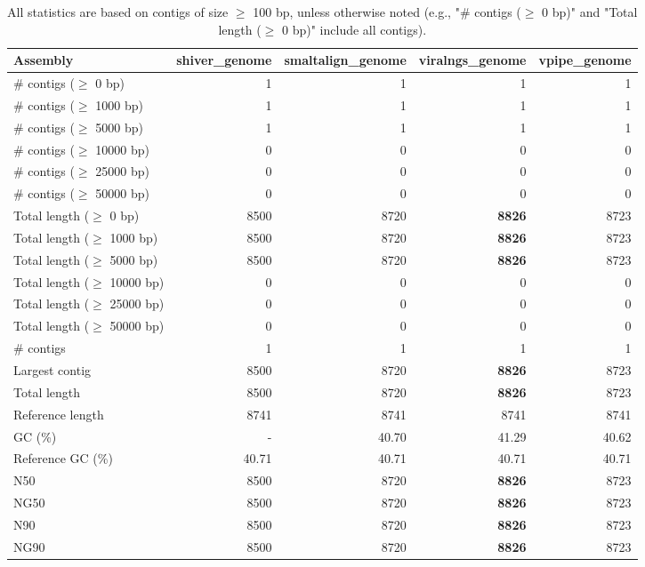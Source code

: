 \documentclass[12pt,a4paper]{article}
\begin{document}
\begin{table}[ht]
\begin{center}
\caption{All statistics are based on contigs of size $\geq$ 100 bp, unless otherwise noted (e.g., "\# contigs ($\geq$ 0 bp)" and "Total length ($\geq$ 0 bp)" include all contigs).}
\begin{tabular}{|l*{4}{|r}|}
\hline
Assembly & shiver\_genome & smaltalign\_genome & viralngs\_genome & vpipe\_genome \\ \hline
\# contigs ($\geq$ 0 bp) & 1 & 1 & 1 & 1 \\ \hline
\# contigs ($\geq$ 1000 bp) & 1 & 1 & 1 & 1 \\ \hline
\# contigs ($\geq$ 5000 bp) & 1 & 1 & 1 & 1 \\ \hline
\# contigs ($\geq$ 10000 bp) & 0 & 0 & 0 & 0 \\ \hline
\# contigs ($\geq$ 25000 bp) & 0 & 0 & 0 & 0 \\ \hline
\# contigs ($\geq$ 50000 bp) & 0 & 0 & 0 & 0 \\ \hline
Total length ($\geq$ 0 bp) & 8500 & 8720 & {\bf 8826} & 8723 \\ \hline
Total length ($\geq$ 1000 bp) & 8500 & 8720 & {\bf 8826} & 8723 \\ \hline
Total length ($\geq$ 5000 bp) & 8500 & 8720 & {\bf 8826} & 8723 \\ \hline
Total length ($\geq$ 10000 bp) & 0 & 0 & 0 & 0 \\ \hline
Total length ($\geq$ 25000 bp) & 0 & 0 & 0 & 0 \\ \hline
Total length ($\geq$ 50000 bp) & 0 & 0 & 0 & 0 \\ \hline
\# contigs & 1 & 1 & 1 & 1 \\ \hline
Largest contig & 8500 & 8720 & {\bf 8826} & 8723 \\ \hline
Total length & 8500 & 8720 & {\bf 8826} & 8723 \\ \hline
Reference length & 8741 & 8741 & 8741 & 8741 \\ \hline
GC (\%) & - & 40.70 & 41.29 & 40.62 \\ \hline
Reference GC (\%) & 40.71 & 40.71 & 40.71 & 40.71 \\ \hline
N50 & 8500 & 8720 & {\bf 8826} & 8723 \\ \hline
NG50 & 8500 & 8720 & {\bf 8826} & 8723 \\ \hline
N90 & 8500 & 8720 & {\bf 8826} & 8723 \\ \hline
NG90 & 8500 & 8720 & {\bf 8826} & 8723 \\ \hline

\end{tabular}
\end{center}
\end{table}
\end{document}
